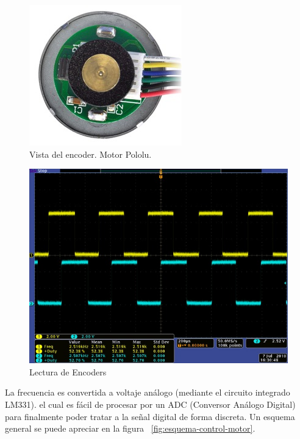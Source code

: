 \begin{figure}[h!]
  \centering
  \includegraphics[scale=0.7]{images/activities/motor_pololu/motor2.jpg}
  \caption{Vista del encoder. Motor Pololu.}
  \label{fig:motor-pololu-2}
\end{figure}

\begin{figure}[h!]
  \centering
  \includegraphics[scale=0.7]{images/activities/motor_pololu/motor3.jpg}
  \caption{Lectura de Encoders}
  \label{fig:motor-pololu-3}
\end{figure}

La frecuencia es convertida a voltaje análogo (mediante el circuito integrado LM331). el cual es fácil de procesar por un ADC (Conversor Análogo Digital) para finalmente poder tratar a la señal digital de forma discreta. Un esquema general se puede apreciar en la figura ~\ref{fig:esquema-control-motor}.

